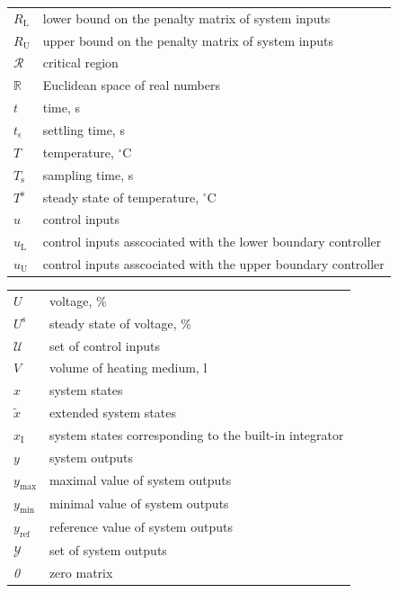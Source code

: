 \documentclass[preprint,12pt]{elsarticle}
\begin{document}
\begin{center}
\begin{tabular}{ l l }
$R_{\mathrm{L}}$ & lower bound on the penalty matrix of system inputs \\
$R_{\mathrm{U}}$ & upper bound on the penalty matrix of system inputs \\
$\mathcal{R}$ & critical region \\
$\mathbb{R}$ & Euclidean space of real numbers \\
$t$ & time, s \\
$t_{\epsilon}$ & settling time, s \\
$T$ & temperature, $^{\circ}\mathrm{C}$ \\
$T_{\mathrm{s}}$ & sampling time, s \\
$T^{\mathrm{s}}$ & steady state of temperature, $^{\circ}\mathrm{C}$ \\
$u$ & control inputs \\
$u_{\mathrm{L}}$ & control inputs asscociated with the lower boundary controller\\
$u_{\mathrm{U}}$ & control inputs asscociated with the upper boundary controller\\
\end{tabular}
\end{center}


\begin{center}
	\begin{tabular}{ l l }
$U$ & voltage, \% \\
$U^{\mathrm{s}}$ & steady state of voltage, \% \\
$\mathcal{U}$ & set of control inputs \\
$V$ & volume of heating medium, l \\
$x$ & system states \\
$\widetilde{x}$ & extended system states \\
$x_{\mathrm{I}}$ & system states corresponding to the built-in integrator \\
$y$ & system outputs \\
$y_\mathrm{\max}$ & maximal value of system outputs \\
$y_\mathrm{\min}$ & minimal value of system outputs \\
$y_\mathrm{ref}$ & reference value of system outputs \\	
$\mathcal{Y}$ & set of system outputs \\
\textit{0} & zero matrix
\end{tabular}
\end{center}
\end{document}
